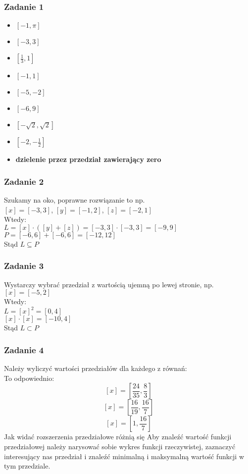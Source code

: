 \documentclass[a4paper]{article}
\begin{document}
\subsubsection*{Zadanie 1}
\begin{itemize}
\item $[-1,\pi]$
\item $[-3,3]$
\item $[\frac{1}{3}, 1]$
\item $[-1,1]$
\item $[-5, -2]$
\item $[-6, 9]$
\item $[-\sqrt{2}, \sqrt{2}]$
\item $[-2, -\frac{1}{2}]$
\item \textbf{dzielenie przez przedział zawierający zero}
\end{itemize}

\subsubsection*{Zadanie 2}
Szukamy na oko, poprawne rozwiązanie to np.\\
$[x] = [-3,3]$, $[y] = [-1,2]$, $[z] = [-2,1]$ \\
Wtedy: \\
$L = [x]\cdot([y] + [z]) = [-3,3]\cdot[-3,3] = [-9,9] $\\
$P = [-6,6]+[-6,6] = [-12, 12] $ \\
Stąd $L\subseteq P$

\subsubsection*{Zadanie 3}
Wystarczy wybrać przedział z wartością ujemną po lewej stronie, np.\\
$[x] = [-5,2]$ \\
Wtedy:\\
$L = [x]^2 = [0, 4]$ \\
$[x]\cdot[x] = [-10, 4]$ \\
Stąd $L\subset P$

\subsubsection*{Zadanie 4}
Należy wyliczyć wartości przedziałów dla każdego z równań:\\
To odpowiednio:
$$[x]=\left[\frac{24}{35}, \frac{8}{3}\right]$$
$$[x]=\left[\frac{16}{19}, \frac{16}{7}\right]$$
$$[x]=\left[1,\frac{16}{7}\right]$$
Jak widać rozszerzenia przedziałowe różnią się
Aby znaleźć wartość funkcji przedziałowej należy narysować sobie wykres funkcji rzeczywistej, zaznaczyć interesujący nas przedział i znaleźć minimalną i maksymalną wartość funkcji w tym przedziale.
\end{document}
